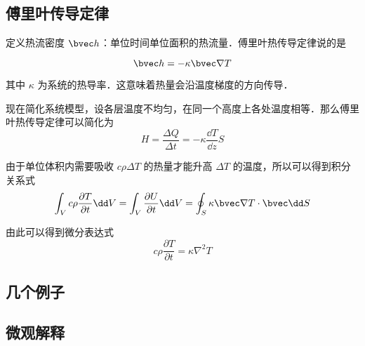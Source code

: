
\subsection{傅里叶传导定律}
定义热流密度 $\bvec h$：单位时间单位面积的热流量．傅里叶热传导定律说的是

\begin{equation}
\bvec h = -\kappa \bvec \nabla T
\end{equation}

其中 $\kappa$ 为系统的热导率．这意味着热量会沿温度梯度的方向传导．

现在简化系统模型，设各层温度不均匀，在同一个高度上各处温度相等．那么傅里叶热传导定律可以简化为
\begin{equation}
H=\frac{\Delta Q}{\Delta t}=-\kappa \frac{\dd T}{\dd z}S
\end{equation}

由于单位体积内需要吸收 $c\rho \Delta T$ 的热量才能升高 $\Delta T$ 的温度，所以可以得到积分关系式
\begin{equation}
\int_V c\rho \frac{\partial T}{\partial t} \dd V = \int_V \frac{\partial U}{\partial t} \dd V= \oint_S \kappa \bvec \nabla T \cdot \bvec \dd S
\end{equation}

由此可以得到微分表达式
\begin{equation}
c\rho \frac{\partial T}{\partial t} = \kappa \nabla^2 T
\end{equation}
\subsection{几个例子}

\subsection{微观解释}